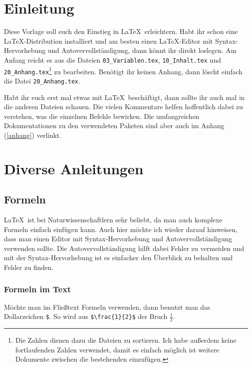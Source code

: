 \chapter{Einleitung}

Diese Vorlage soll euch den Einstieg in \LaTeX\ erleichtern. Habt ihr schon eine \LaTeX-Distribution installiert und am besten einen \LaTeX-Editor mit Syntax-Hervorhebung und Autovervollständigung, dann könnt ihr direkt loslegen. Am Anfang reicht es aus die Dateien \verb+03_Variablen.tex+, \verb+10_Inhalt.tex+ und \verb+20_Anhang.tex+\footnote{Die Zahlen dienen dazu die Dateien zu sortieren. Ich habe außerdem keine fortlaufenden Zahlen verwendet, damit es einfach möglich ist weitere Dokumente zwischen die bestehenden einzufügen.} zu bearbeiten. Benötigt ihr keinen Anhang, dann löscht einfach die Datei \verb+20_Anhang.tex+.

Habt ihr euch erst mal etwas mit \LaTeX\ beschäftigt, dann sollte ihr auch mal in die anderen Dateien schauen. Die vielen Kommentare helfen hoffentlich dabei zu verstehen, was die einzelnen Befehle bewirken. Die umfangreichen Dokumentationen zu den verwendeten Paketen sind aber auch im Anhang (\ref{anhang}) verlinkt.

\newpage
\chapter{Diverse Anleitungen}
\section{Formeln}

\LaTeX\ ist bei Naturwissenschaftlern sehr beliebt, da man auch komplexe Formeln einfach einfügen kann. Auch hier möchte ich wieder darauf hinweisen, dass man einen Editor mit Syntax-Hervorhebung und Autovervollständigung verwenden sollte. Die Autovervollständigung hilft dabei Fehler zu vermeiden und mit der Syntax-Hervorhebung ist es einfacher den Überblick zu behalten und Fehler zu finden.

\subsection{Formeln im Text}

Möchte man im Fließtext Formeln verwenden, dann benutzt man das Dollarzeichen \verb+$+. So wird aus \verb+$\frac{1}{2}$+ der Bruch $\frac{1}{2}$.

